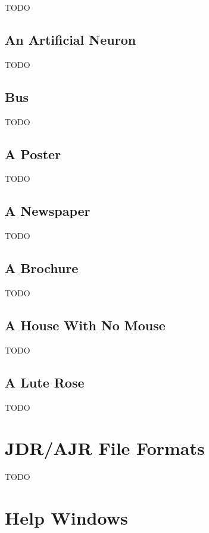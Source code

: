 TODO


\section{An Artificial Neuron}\label{sec:neuronexample}

TODO


\section{Bus}\label{sec:busexample}

TODO


\section{A Poster}\label{sec:postertutorial}

TODO


\section{A Newspaper}\label{sec:newstutorial}

TODO


\section{A Brochure}\label{sec:brochure}

TODO


\section{A House With No Mouse}\label{sec:accesstutorial}

TODO


\section{A Lute Rose}\label{sec:rosetutorial}

TODO


\chapter{JDR/AJR File Formats}\label{sec:jdrajrformat}

TODO


\chapter{Help Windows}
\label{sec:helpwindows}

